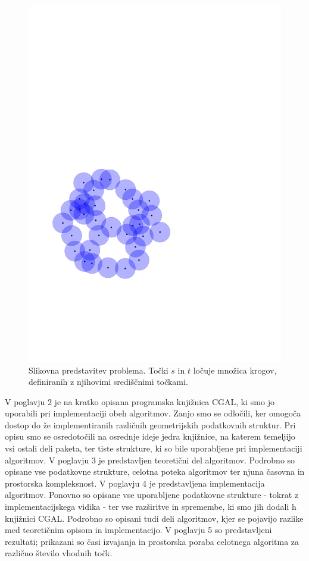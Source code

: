 \documentclass[a4paper, 12pt]{book}
\begin{document}
\begin{figure}
\centerline{\includegraphics[scale=0.6,page=4]{pics/unitdisks.pdf}}
\caption{Slikovna predstavitev problema. Točki $s$ in $t$ ločuje množica krogov, definiranih z njihovimi središčnimi točkami.}
\label{separation}
\end{figure}

V poglavju 2 je na kratko opisana programska knjižnica CGAL, ki smo jo uporabili pri implementaciji obeh algoritmov. Zanjo smo se odločili, ker omogoča dostop do že implementiranih različnih geometrijskih podatkovnih struktur. Pri opisu smo se osredotočili na osrednje ideje jedra knjižnice, na katerem temeljijo vsi ostali deli paketa, ter tiste strukture, ki so bile uporabljene pri implementaciji algoritmov. V poglavju 3 je predstavljen teoretični del algoritmov. Podrobno so opisane vse podatkovne strukture, celotna poteka algoritmov ter njuna časovna in prostorska kompleksnost. V poglavju 4 je predstavljena implementacija algoritmov. Ponovno so opisane vse uporabljene podatkovne strukture - tokrat z implementacijskega vidika - ter vse razširitve in spremembe, ki smo jih dodali h knjižnici CGAL. Podrobno so opisani tudi deli algoritmov, kjer se pojavijo razlike med teoretičnim opisom in implementacijo. V poglavju 5 so predstavljeni rezultati; prikazani so časi izvajanja in prostorska poraba celotnega algoritma za različno število vhodnih točk.
\end{document}
